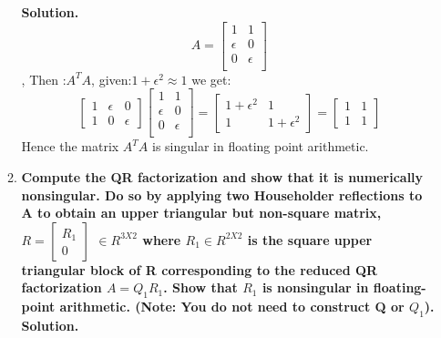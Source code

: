 \documentclass[12pt, oneside]{article}   	%
\begin{document}
\begin{enumerate}
\begin{enumerate}
		\textbf{Solution.}\\
		 $$
		 A= \left [\begin{array}{cc} 1&1\\
		 \epsilon&0\\
		 0&\epsilon\\			
		 \end{array}\right]
		 $$,
		 Then :$A^TA$, given:$1+\epsilon^2\approx 1$ we get:\\
		 $$
		 \left [\begin{array}{ccc} 1& \epsilon&0\\
		 1&0& \epsilon		
		 \end{array}\right] \left [\begin{array}{cc} 1&1\\
		 \epsilon&0\\
		 0&\epsilon\\			
		 \end{array}\right]= \left [\begin{array}{cc} 1+ \epsilon^2&1\\
		 1&1+ \epsilon^2		
		 \end{array}\right]=\left [\begin{array}{cc} 1&1\\
		 1&1		
		 \end{array}\right]
		 $$
		 Hence the matrix $A^TA$ is singular in floating point arithmetic.\\
		
		
		\item  \textbf{Compute the QR factorization and show that it is numerically nonsingular. Do so by applying two Householder reflections to A to obtain an upper triangular but non-square matrix,
			$
			R= \left [\begin{array}{c} R_1\\
			0
			\end{array}\right]
			$  $\in R^{3 X2}$ where $R_1 \in R^{2X2}$ is the square upper triangular block of R corresponding to the reduced QR factorization $A = Q_1R_1$. Show that $R_1$ is nonsingular in floating-point arithmetic.
			(Note: You do not need to construct Q or $Q_1$).}\\
		
		\textbf{Solution.}\\
		

\end{enumerate}
\end{enumerate}
\end{document}
